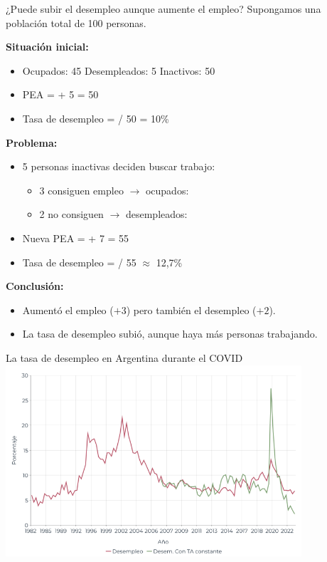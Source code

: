 \documentclass{beamer}
\begin{document}
\begin{frame}{¿Puede subir el desempleo aunque aumente el empleo?}
\small
Supongamos una población total de 100 personas.

\textbf{Situación inicial:}
\begin{itemize}
    \item Ocupados: 45 \quad Desempleados: 5 \quad Inactivos: 50
    \item PEA =  + 5 = 50
    \item Tasa de desempleo =  / 50 = 10\%
\end{itemize}
\textbf{Problema:}
\begin{itemize}
    \item 5 personas inactivas deciden buscar trabajo:
    \begin{itemize}
        \item 3 consiguen empleo $\rightarrow$ ocupados: 
        \item 2 no consiguen $\rightarrow$ desempleados: 
    \end{itemize}
    \item Nueva PEA =  + 7 = 55
    \item Tasa de desempleo =  / 55 $\approx$ 12{,}7\%
\end{itemize}
\textbf{Conclusión:}
\begin{itemize}
    \item Aumentó el empleo (\(+3\)) pero también el desempleo (\(+2\)).
    \item La tasa de desempleo subió, aunque haya más personas trabajando.
\end{itemize}
\end{frame}

\begin{frame}{La tasa de desempleo en Argentina durante el COVID}
    \centering
    \includegraphics[width=11cm]{../Figures/C34.15.png}
\end{frame}
\end{document}
